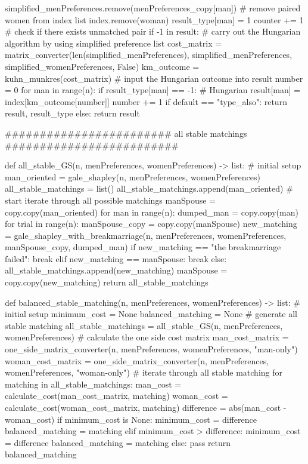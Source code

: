 \documentclass[14pt]{extarticle}
\begin{document}
\begin{python}
            simplified_menPreferences.remove(menPreferences_copy[man]) 
            # remove paired women from index list    
            index.remove(woman) 
            result_type[man] = 1 
            counter += 1        
    # check if there exists unmatched pair   
    if -1 in result:            
        # carry out the Hungarian algorithm by using simplified preference list
        cost_matrix = matrix_converter(len(simplified_menPreferences), simplified_menPreferences, simplified_womenPreferences, False)
        km_outcome = kuhn_munkres(cost_matrix)
        # input the Hungarian outcome into result
        number = 0
        for man in range(n):
            if result_type[man] == -1: # Hungarian
                result[man] = index[km_outcome[number]]
                number += 1
    if default == "type_also":            
        return result, result_type      
    else:
        return result  

######################## all stable matchings #########################
 
def all_stable_GS(n, menPreferences, womenPreferences) -> list:
    # initial setup
    man_oriented = gale_shapley(n, menPreferences, womenPreferences)
    all_stable_matchings = list()
    all_stable_matchings.append(man_oriented)
    # start iterate through all possible matchings  
    manSpouse = copy.copy(man_oriented) 
    for man in range(n): 
        dumped_man = copy.copy(man)
        for trial in range(n):
            manSpouse_copy = copy.copy(manSpouse)
            new_matching = gale_shapley_with_breakmarriage(n, menPreferences, womenPreferences, manSpouse_copy, dumped_man)
            if new_matching == "the breakmarriage failed":
                break
            elif new_matching == manSpouse:
                break
            else:
                all_stable_matchings.append(new_matching)
                manSpouse = copy.copy(new_matching)
    return all_stable_matchings 

def balanced_stable_matching(n, menPreferences, womenPreferences) -> list:
    # initial setup
    minimum_cost = None
    balanced_matching = None
    # generate all stable matching
    all_stable_matchings = all_stable_GS(n, menPreferences, womenPreferences)
    # calculate the one side cost matrix    
    man_cost_matrix = one_side_matrix_converter(n, menPreferences, womenPreferences, "man-only")
    woman_cost_matrix = one_side_matrix_converter(n, menPreferences, womenPreferences, "woman-only")
    # iterate through all stable matching
    for matching in all_stable_matchings:
        man_cost = calculate_cost(man_cost_matrix, matching)
        woman_cost = calculate_cost(woman_cost_matrix, matching)
        difference = abs(man_cost - woman_cost)
        if minimum_cost is None:
            minimum_cost = difference
            balanced_matching = matching
        elif minimum_cost > difference:
            minimum_cost = difference
            balanced_matching = matching
        else:
            pass
    return balanced_matching        


\end{python}
\end{document}
